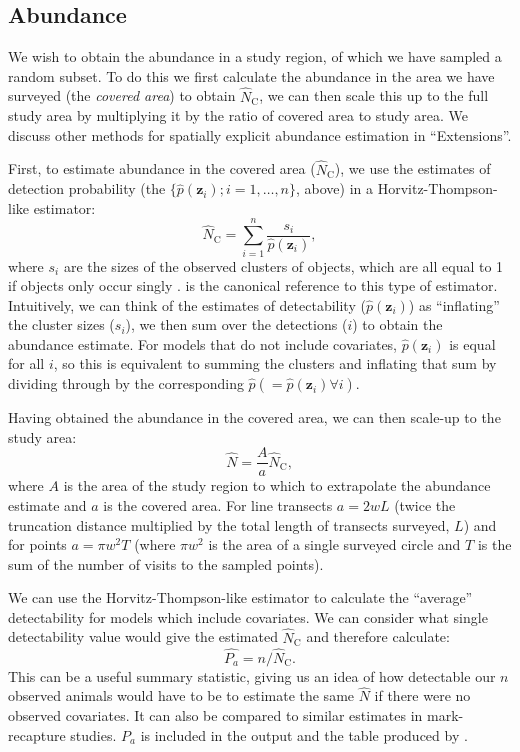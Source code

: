 \documentclass[article]{jss}\usepackage[]{graphicx}\usepackage[]{color}
\begin{document}
\subsection{Abundance}

We wish to obtain the abundance in a study region, of which we have sampled a random subset. To do this we first calculate the abundance in the area we have surveyed (the \textit{covered area}) to obtain $\hat{N}_\text{C}$, we can then scale this up to the full study area by multiplying it by the ratio of covered area to study area. We discuss other methods for spatially explicit abundance estimation in ``Extensions''.

First, to estimate abundance in the covered area ($\hat{N}_\text{C}$), we use the estimates of detection probability (the $\{\hat{p}(\mathbf{z}_i); i=1,\ldots,n\}$, above) in a Horvitz-Thompson-like estimator:
\begin{equation}
\hat{N}_\text{C} = \sum_{i=1}^n\frac{s_i}{\hat{p}(\mathbf{z}_i)},
\label{ht}
\end{equation}
where $s_i$ are the sizes of the observed clusters of objects, which are all equal to 1 if objects only occur singly \citep{Borchers:2004wr}. \cite{thompson2012sampling} is the canonical reference to this type of estimator. Intuitively, we can think of the estimates of detectability ($\hat{p}(\mathbf{z}_i)$) as ``inflating'' the cluster sizes ($s_i$), we then sum over the detections ($i$) to obtain the abundance estimate. For models that do not include covariates, $\hat{p}(\mathbf{z}_i)$ is equal for all $i$, so this is equivalent to summing the clusters and inflating that sum by dividing through by the corresponding $\hat{p} (=\hat{p}(\mathbf{z}_i) \forall i)$.

Having obtained the abundance in the covered area, we can then scale-up to the study area:
$$
\hat{N} = \frac{A}{a} \hat{N}_\text{C},
$$
where $A$ is the area of the study region to which to extrapolate the abundance estimate and $a$ is the covered area. For line transects $a=2wL$ (twice the truncation distance multiplied by the total length of transects surveyed, $L$) and for points $a=\pi w^2 T$ (where $\pi w^2$ is the area of a single surveyed circle and $T$ is the sum of the number of visits to the sampled points).

We can use the Horvitz-Thompson-like estimator to calculate the ``average'' detectability for models which include covariates. We can consider what single detectability value would give the estimated $\hat{N}_\text{C}$ and therefore calculate:
$$
\hat{P_a} = n/\hat{N}_\text{C}.
$$
This can be a useful summary statistic, giving us an idea of how detectable our $n$ observed animals would have to be to estimate the same $\hat{N}$ if there were no observed covariates. It can also be compared to similar estimates in mark-recapture studies. $P_a$ is included in the  output and the table produced by .
\end{document}

